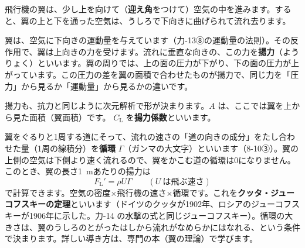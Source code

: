 \label{ph:力-15:sec9}飛行機の翼は、少し上を向けて（\textbf{迎え角}をつけて）空気の中を進みます。すると、翼の上と下を通った空気は、うしろで下向きに曲げられて流れ去ります。

\begin{bkfigure}
\label{ph:力-15:fig-yoku}
\end{bkfigure}

\noindent 翼は、空気に下向きの運動量を与えています（力-13⑧の運動量の法則）。その反作用で、翼は上向きの力を受けます。流れに垂直な向きの、この力を\textbf{揚力}（ようりょく）といいます。翼の周りでは、上の面の圧力が下がり、下の面の圧力が上がっています。この圧力の差を翼の面積で合わせたものが揚力で、同じ力を「圧力」から見るか「運動量」から見るかの違いです。

揚力も、抗力と同じように次元解析で形が決まります。$A$ は、ここでは翼を上から見た面積（翼面積）です。\label{ph:力-15:youryoku}
\noindent $C_{\mathrm L}$ を\textbf{揚力係数}といいます。

\begin{motto}[4]
翼をぐるりと1周する道にそって、流れの速さの「道の向きの成分」をたし合わせた量（1周の線積分）を\textbf{循環} $\Gamma$（ガンマの大文字）といいます（8-10③）。翼の上側の空気は下側より速く流れるので、翼をかこむ道の循環は0になりません。このとき、翼の長さ\qty{1}{m}あたりの揚力は
\[ F_{\mathrm L}'=\rho U\Gamma\qquad(U\ \text{は飛ぶ速さ}) \]
で計算できます。空気の密度×飛行機の速さ×循環です。これを\textbf{クッタ・ジューコフスキーの定理}といいます（ドイツのクッタが1902年、ロシアのジューコフスキーが1906年に示した。力-14 の水撃の式と同じジューコフスキー）。循環の大きさは、翼のうしろのとがったはしから流れがなめらかにはなれる、という条件で決まります。詳しい導き方は、専門の本（翼の理論）で学びます。
\end{motto}

